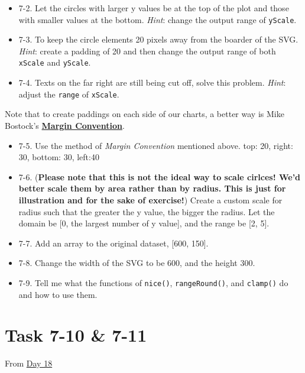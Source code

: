 \documentclass[
]{book}
\begin{document}
\begin{itemize}
\item
  7-2. Let the circles with larger y values be at the top of the plot and those with smaller values at the bottom. \emph{Hint}: change the output range of \texttt{yScale}.
\item
  7-3. To keep the circle elements 20 pixels away from the boarder of the SVG. \emph{Hint}: create a padding of 20 and then change the output range of both \texttt{xScale} and \texttt{yScale}.
\item
  7-4. Texts on the far right are still being cut off, solve this problem. \emph{Hint}: adjust the \texttt{range} of \texttt{xScale}.
\end{itemize}

Note that to create paddings on each side of our charts, a better way is Mike Bostock's \href{https://observablehq.com/@d3/margin-convention}{\textbf{Margin Convention}}.

\begin{itemize}
\item
  7-5. Use the method of \emph{Margin Convention} mentioned above. top: 20, right: 30, bottom: 30, left:40
\item
  7-6. (\textbf{Please note that this is not the ideal way to scale cirlces! We'd better scale them by area rather than by radius. This is just for illustration and for the sake of exercise!}) Create a custom scale for radius such that the greater the y value, the bigger the radius. Let the domain be {[}0, the largest number of y value{]}, and the range be {[}2, 5{]}.
\item
  7-7. Add an array to the original dataset, {[}600, 150{]}.
\item
  7-8. Change the width of the SVG to be 600, and the height 300.
\item
  7-9. Tell me what the functions of \texttt{nice()}, \texttt{rangeRound()}, and \texttt{clamp()} do and how to use them.
\end{itemize}

\hypertarget{task-7-10-7-11}{%
\section{Task 7-10 \& 7-11}\label{task-7-10-7-11}}

From \href{https://observablehq.com/@hongtaoh/day-eighteen-sept-11-2020}{Day 18}
\end{document}
